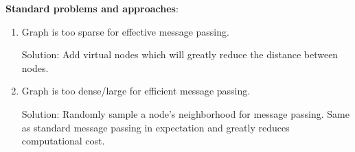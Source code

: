 \documentclass[12pt]{article}
\newcommand{\tbf}{\textbf}
\begin{document}
\tbf{Standard problems and approaches}:
\begin{enumerate}
  \itemsep0em
  \item Graph is too sparse for effective message passing.

    Solution: Add virtual nodes which will greatly reduce the distance between
    nodes.
  \item Graph is too dense/large for efficient message passing.

    Solution: Randomly sample a node's neighborhood for message passing. Same as
    standard message passing in expectation and greatly reduces computational
    cost.
\end{enumerate}
\end{document}
